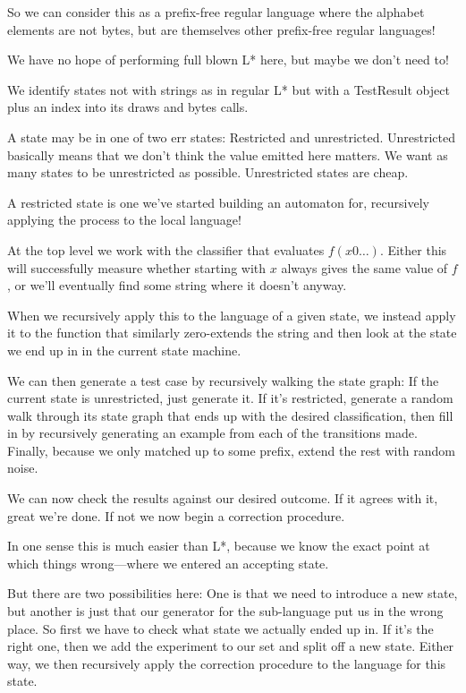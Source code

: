 \documentclass[a4paper]{book}
\begin{document}
So we can consider this as a prefix-free regular language where the alphabet elements are not bytes,
but are themselves other prefix-free regular languages!

We have no hope of performing full blown L* here,
but maybe we don't need to!

We identify states not with strings as in regular L* but with a TestResult object plus an index into its draws and bytes calls.

A state may be in one of two err states:
Restricted and unrestricted.
Unrestricted basically means that we don't think the value emitted here matters.
We want as many states to be unrestricted as possible.
Unrestricted states are cheap.

A restricted state is one we've started building an automaton for,
recursively applying the process to the local language!

At the top level we work with the classifier that evaluates \(f(x0\ldots)\).
Either this will successfully measure whether starting with \(x\) always gives the same value of \(f\),
or we'll eventually find some string where it doesn't anyway.

When we recursively apply this to the language of a given state,
we instead apply it to the function that similarly zero-extends the string and then look at the state we end up in in the current state machine.

We can then generate a test case by recursively walking the state graph:
If the current state is unrestricted,
just generate it.
If it's restricted,
generate a random walk through its state graph that ends up with the desired classification,
then fill in by recursively generating an example from each of the transitions made.
Finally, because we only matched up to some prefix, extend the rest with random noise.

We can now check the results against our desired outcome.
If it agrees with it, great we're done.
If not we now begin a correction procedure.

In one sense this is much easier than L*,
because we know the exact point at which things wrong---where
we entered an accepting state.

But there are two possibilities here:
One is that we need to introduce a new state,
but another is just that our generator for the sub-language put us in the wrong place.
So first we have to check what state we actually ended up in.
If it's the right one,
then we add the experiment to our set and split off a new state.
Either way, we then recursively apply the correction procedure to the language for this state.
\end{document}
